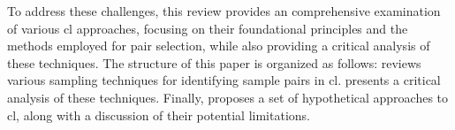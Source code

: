 To address these challenges, 
this review provides an comprehensive examination of various \ac{cl} approaches, 
focusing on their foundational principles and the methods employed for pair selection, 
while also providing a critical analysis of these techniques.
The structure of this paper is organized as follows:
 reviews various sampling techniques for identifying sample pairs in \ac{cl}.
 presents a critical analysis of these techniques. 
Finally,  proposes a set of hypothetical approaches to \ac{cl}, 
along with a discussion of their potential limitations.
